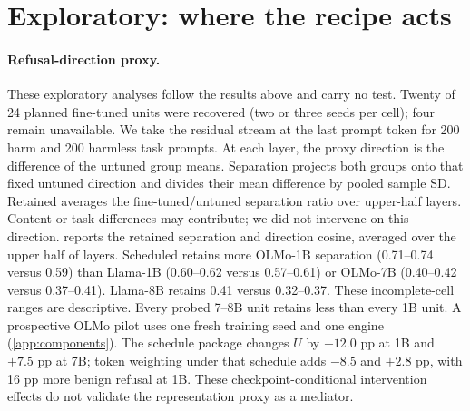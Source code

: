 \documentclass{article}
\begin{document}
\section{Exploratory: where the recipe acts}
\label{sec:mechanism}

\paragraph{Refusal-direction proxy.} These exploratory analyses follow the
results above and carry no test. Twenty of 24 planned fine-tuned units were
recovered (two or three seeds per cell); four remain unavailable. We take
the residual stream at the last prompt token for 200 harm and 200 harmless
task prompts. At each layer, the proxy direction is the difference of the
untuned group means. Separation projects both groups onto that fixed untuned
direction and divides their mean difference by pooled sample SD. Retained
averages the fine-tuned/untuned separation ratio over upper-half layers.
Content or task differences may contribute; we did not intervene on this direction.  reports the retained
separation and direction cosine, averaged over the upper half of layers.
Scheduled retains more OLMo-1B separation (0.71--0.74 versus 0.59) than
Llama-1B (0.60--0.62 versus 0.57--0.61) or OLMo-7B (0.40--0.42 versus
0.37--0.41). Llama-8B retains 0.41 versus 0.32--0.37. These incomplete-cell
ranges are descriptive. Every probed 7--8B unit retains less than every 1B unit.
A prospective OLMo pilot uses one fresh training seed and one engine
(\cref{app:components}). The schedule package changes $U$ by $-12.0$ pp at
1B and $+7.5$ pp at 7B; token weighting under that schedule adds $-8.5$ and
$+2.8$ pp, with 16 pp more benign refusal at 1B. These checkpoint-conditional
intervention effects do not validate the representation proxy as a mediator.
\end{document}
